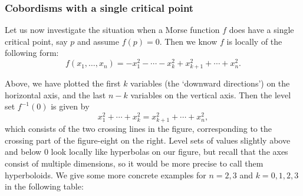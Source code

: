 \subsubsection*{Cobordisms with a single critical point}
Let us now investigate the situation when a Morse function $f$ does have a single critical point, say $p$ and assume $f(p) = 0$.
Then we know $f$ is locally of the following form:
\[
    f(x_1, \ldots, x_n) = - x_1^2 - \cdots - x_k^2 + x_{k+1}^2 + \cdots + x_n^2
.\] 
\begin{figure}[H]
    \centering
\end{figure}
\vspace{-1cm}
Above, we have plotted the first $k$ variables (the `downward directions') on the horizontal axis, and the last $n-k$ variables on the vertical axis.
Then the level set $f^{-1}(0)$ is given by
\[
x_1^2 + \cdots + x_k^2 = x_{k+1} ^2 + \cdots + x_n^2
,\] 
which consists of the two crossing lines in the figure, corresponding to the crossing part of the figure-eight on the right.
Level sets of values slightly above and below $0$ look locally like hyperbolas on our figure, but recall that the axes consist of multiple dimensions, so it would be more precise to call them hyperboloids. We give some more concrete examples for $n=2,3$ and  $k=0,1,2,3$ in the following table:
\bigskip
\begin{table}[H]
    \centering
\end{table}
\clearpage


